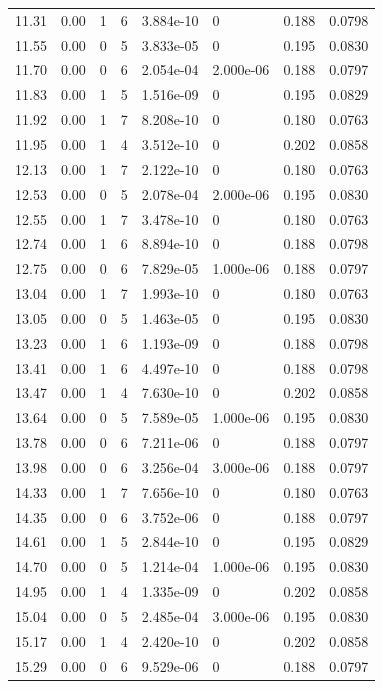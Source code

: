 \documentclass[preview]{standalone}
\begin{document}
{{{\begin{tabular}{L{1.2cm}C{1.2cm} C{0.3cm}C{0.5cm} C{1.4cm}C{1.4cm} C{1.4cm}C{1.4cm}}
  11.31  &  0.00  & 1     &  6 &  3.884e-10  & 0  & 0.188 &  0.0798   \\ 
  11.55  &  0.00  & 0     &  5 &  3.833e-05  & 0  & 0.195 &  0.0830   \\ 
  11.70  &  0.00  & 0     &  6 &  2.054e-04  & 2.000e-06  & 0.188 &  0.0797   \\ 
  11.83  &  0.00  & 1     &  5 &  1.516e-09  & 0  & 0.195 &  0.0829   \\ 
  11.92  &  0.00  & 1     &  7 &  8.208e-10  & 0  & 0.180 &  0.0763   \\ 
  11.95  &  0.00  & 1     &  4 &  3.512e-10  & 0  & 0.202 &  0.0858   \\ 
  12.13  &  0.00  & 1     &  7 &  2.122e-10  & 0  & 0.180 &  0.0763   \\ 
  12.53  &  0.00  & 0     &  5 &  2.078e-04  & 2.000e-06  & 0.195 &  0.0830   \\ 
  12.55  &  0.00  & 1     &  7 &  3.478e-10  & 0  & 0.180 &  0.0763   \\ 
  12.74  &  0.00  & 1     &  6 &  8.894e-10  & 0  & 0.188 &  0.0798   \\ 
  12.75  &  0.00  & 0     &  6 &  7.829e-05  & 1.000e-06  & 0.188 &  0.0797   \\ 
  13.04  &  0.00  & 1     &  7 &  1.993e-10  & 0  & 0.180 &  0.0763   \\ 
  13.05  &  0.00  & 0     &  5 &  1.463e-05  & 0  & 0.195 &  0.0830   \\ 
  13.23  &  0.00  & 1     &  6 &  1.193e-09  & 0  & 0.188 &  0.0798   \\ 
  13.41  &  0.00  & 1     &  6 &  4.497e-10  & 0  & 0.188 &  0.0798   \\ 
  13.47  &  0.00  & 1     &  4 &  7.630e-10  & 0  & 0.202 &  0.0858   \\ 
  13.64  &  0.00  & 0     &  5 &  7.589e-05  & 1.000e-06  & 0.195 &  0.0830   \\ 
  13.78  &  0.00  & 0     &  6 &  7.211e-06  & 0  & 0.188 &  0.0797   \\ 
  13.98  &  0.00  & 0     &  6 &  3.256e-04  & 3.000e-06  & 0.188 &  0.0797   \\ 
  14.33  &  0.00  & 1     &  7 &  7.656e-10  & 0  & 0.180 &  0.0763   \\ 
  14.35  &  0.00  & 0     &  6 &  3.752e-06  & 0  & 0.188 &  0.0797   \\ 
  14.61  &  0.00  & 1     &  5 &  2.844e-10  & 0  & 0.195 &  0.0829   \\ 
  14.70  &  0.00  & 0     &  5 &  1.214e-04  & 1.000e-06  & 0.195 &  0.0830   \\ 
  14.95  &  0.00  & 1     &  4 &  1.335e-09  & 0  & 0.202 &  0.0858   \\ 
  15.04  &  0.00  & 0     &  5 &  2.485e-04  & 3.000e-06  & 0.195 &  0.0830   \\ 
  15.17  &  0.00  & 1     &  4 &  2.420e-10  & 0  & 0.202 &  0.0858   \\ 
  15.29  &  0.00  & 0     &  6 &  9.529e-06  & 0  & 0.188 &  0.0797   \\ 
\hline 
\end{tabular} 

}}}
\end{document}
